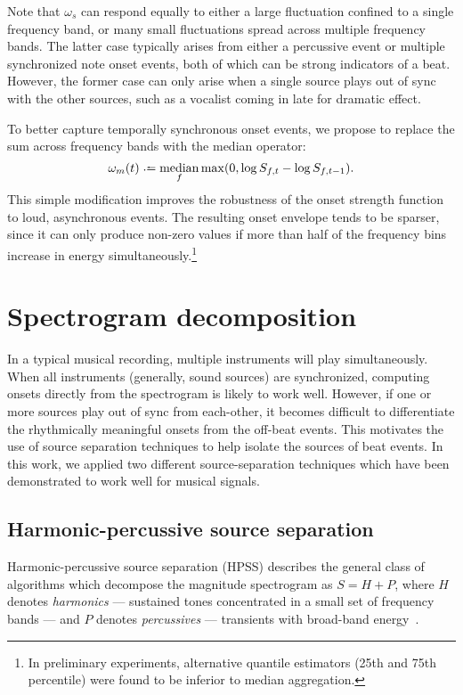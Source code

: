 \documentclass{article}
\begin{document}
Note that $\omega_s$ can respond equally to either a large fluctuation confined to a 
single frequency band, or many small fluctuations spread across multiple frequency bands.
The latter case typically arises from either a percussive event or multiple synchronized 
note onset events, both of which can be strong indicators of a beat.  However, the former 
case can only arise when a single source plays out of sync with the other sources, such 
as a vocalist coming in late for dramatic effect.

To better capture temporally synchronous onset events, we propose to replace the sum
across frequency bands with the median operator:
\begin{equation}
\omega_m(t) \defeq \median_f \max(0, \log S_{f, t} - \log S_{f, t-1}).\label{eq:onset:median}
\end{equation}
This simple modification improves the robustness of the onset strength function to loud, 
asynchronous events.  The resulting onset envelope tends to be sparser, since it can only 
produce non-zero values if more than half of the frequency bins increase in energy 
simultaneously.\footnote{In preliminary experiments, alternative quantile estimators 
(25th and 75th percentile) were found to be inferior to median aggregation.}

\section{Spectrogram decomposition}
\label{sec:spectrogram}

In a typical musical recording, multiple instruments will play simultaneously. When
all instruments (generally, sound sources) are synchronized, computing onsets
directly from the spectrogram is likely to work well.  
However, if one or more sources play out of sync from each-other, it becomes difficult
to differentiate the rhythmically meaningful onsets from the off-beat events.  This
motivates the use of source separation techniques to help isolate the sources of beat
events.  In this work, we applied two different source-separation techniques which have
been demonstrated to work well for musical signals.

\subsection{Harmonic-percussive source separation}
Harmonic-percussive source separation (HPSS) describes the general class of algorithms
which decompose the magnitude spectrogram as $S = H + P$, where $H$ denotes 
\emph{harmonics} --- sustained tones concentrated in a small set of frequency bands ---  
and $P$ denotes \emph{percussives} --- transients with broad-band 
energy~\cite{ono2008real}.  
\end{document}
